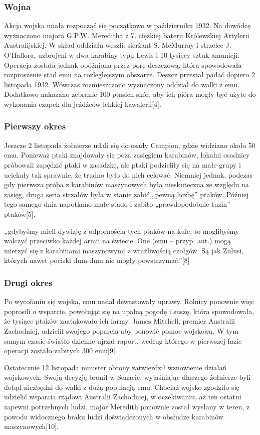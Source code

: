 \documentclass{beamer}
\begin{document}
\begin{frame}
\frametitle{Wojna}
Akcja wojska miała rozpocząć się początkowo w październiku 1932. Na dowódcę wyznaczono majora G.P.W. Mereditha z 7. ciężkiej baterii Królewskiej Artylerii Australijskiej. W skład oddziału weszli: sierżant S. McMurray i strzelec J. O’Hallora, uzbrojeni w dwa karabiny typu Lewis i 10 tysięcy sztuk amunicji. Operacja została jednak opóźniona przez porę deszczową, która spowodowała rozproszenie stad emu na rozleglejszym obszarze. Deszcz przestał padać dopiero 2 listopada 1932. Wówczas rozmieszczono wyznaczony oddział do walki z emu. Dodatkowo nakazano zebranie 100 ptasich skór, aby ich pióra mogły być użyte do wykonania czapek dla jeźdźców lekkiej kawalerii[4].
\end{frame}
\begin{frame}
\frametitle{Pierwszy okres}
Jeszcze 2 listopada żołnierze udali się do osady Campion, gdzie widziano około 50 emu. Ponieważ ptaki znajdowały się poza zasięgiem karabinów, lokalni osadnicy próbowali zapędzić ptaki w zasadzkę, ale ptaki podzieliły się na małe grupy i uciekały tak sprawnie, że trudno było do nich celować. Niemniej jednak, podczas gdy pierwsza próba z karabinów maszynowych była nieskuteczna ze względu na zasięg, druga seria strzałów była w stanie zabić „pewną liczbę” ptaków. Później tego samego dnia napotkano małe stado i zabito „prawdopodobnie tuzin” ptaków[5].
\end{frame}
\begin{frame}
„gdybyśmy mieli dywizję z odpornością tych ptaków na kule, to moglibyśmy walczyć przeciwko każdej armii na świecie. One (emu – przyp. aut.) mogą mierzyć się z karabinami maszynowymi z wrażliwością czołgów. Są jak Zulusi, których nawet pociski dum-dum nie mogły powstrzymać.”[8]
\end{frame}
\begin{frame}
\frametitle{Drugi okres}
Po wycofaniu się wojska, emu nadal dewastowały uprawy. Rolnicy ponownie więc poprosili o wsparcie, powołując się na upalną pogodę i suszę, która spowodowała, że tysiące ptaków zaatakowało ich farmy. James Mitchell, premier Australii Zachodniej, udzielił swojego poparcia aby ponowić pomoc wojskową. W tym samym czasie światło dzienne ujrzał raport, według którego w pierwszej fazie operacji zostało zabitych 300 emu[9].
\end{frame}
\begin{frame}
Ostatecznie 12 listopada minister obrony zatwierdził wznowienie działań wojskowych. Swoją decyzję bronił w Senacie, wyjaśniając dlaczego żołnierze byli dotąd niezbędni do walki z dużą populacją emu. Chociaż wojsko zgodziło się udzielić wsparcia rządowi Australii Zachodniej, w oczekiwaniu, aż ten ostatni zapewni potrzebnych ludzi, major Meredith ponownie został wysłany w teren, z powodu widocznego braku ludzi doświadczonych w obsłudze karabinów maszynowych[10].
\end{frame}
\end{document}
